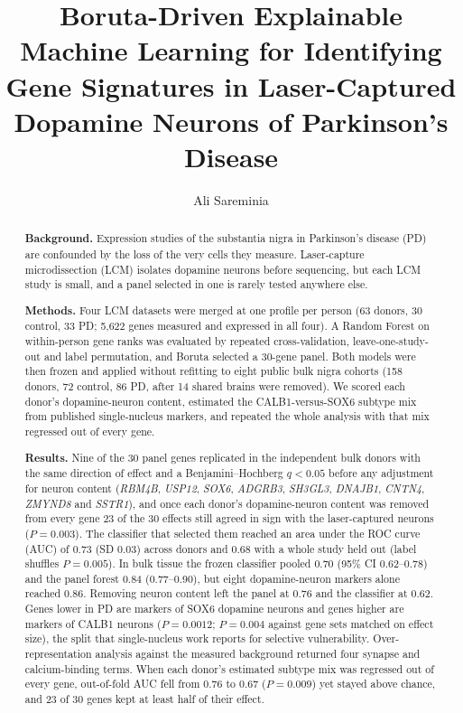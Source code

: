 \documentclass[11pt,a4paper]{article}
\title{Boruta-Driven Explainable Machine Learning for Identifying Gene Signatures in Laser-Captured
Dopamine Neurons of Parkinson's Disease}
\author{Ali Sareminia}
\date{}
\begin{document}
\maketitle

\begin{abstract}
\noindent\textbf{Background.} Expression studies of the substantia nigra in Parkinson's disease (PD) are
confounded by the loss of the very cells they measure. Laser-capture microdissection (LCM)
isolates dopamine neurons before sequencing, but each LCM study is small, and a panel
selected in one is rarely tested anywhere else.

\noindent\textbf{Methods.} Four LCM datasets were merged at one profile per person (63 donors, 30 control, 33
PD; 5,622 genes measured and expressed in all four). A Random Forest on within-person gene ranks was
evaluated by repeated cross-validation, leave-one-study-out and label permutation, and Boruta selected a
30-gene panel. Both models were then frozen and applied without refitting to eight public bulk nigra cohorts
(158 donors, 72 control, 86 PD, after 14 shared brains were removed). We scored each donor's dopamine-neuron content, estimated
the CALB1-versus-SOX6 subtype mix from published single-nucleus markers, and repeated the whole
analysis with that mix regressed out of every gene.

\noindent\textbf{Results.} Nine of the 30 panel genes replicated in the independent bulk donors with the same
direction of effect and a Benjamini--Hochberg $q<0.05$ before any adjustment for neuron content (\textit{RBM4B}, \textit{USP12}, \textit{SOX6},
\textit{ADGRB3}, \textit{SH3GL3}, \textit{DNAJB1}, \textit{CNTN4}, \textit{ZMYND8} and \textit{SSTR1}), and
once each donor's dopamine-neuron content was removed from every gene 23 of the 30 effects still agreed in
sign with the laser-captured neurons ($P=0.003$). The classifier that selected them reached an area under the
ROC curve (AUC) of 0.73 (SD 0.03) across
donors and 0.68 with a whole study held out (label shuffles $P=0.005$). In bulk tissue the frozen classifier
pooled 0.70 (95\% CI 0.62--0.78) and the panel forest 0.84 (0.77--0.90), but eight dopamine-neuron markers
alone reached 0.86. Removing neuron content left the panel at 0.76 and the classifier at 0.62. Genes lower in
PD are markers of SOX6 dopamine neurons and genes higher are markers of CALB1 neurons ($P=0.0012$; $P=0.004$
against gene sets matched on effect size), the split that single-nucleus work reports for selective
vulnerability. Over-representation analysis against the measured background returned four
synapse and calcium-binding terms. When each donor's estimated subtype mix was regressed out of every gene,
out-of-fold AUC fell from 0.76 to 0.67 ($P=0.009$) yet stayed above chance, and 23 of 30 genes kept at least
half of their effect.


\end{abstract}
\end{document}
